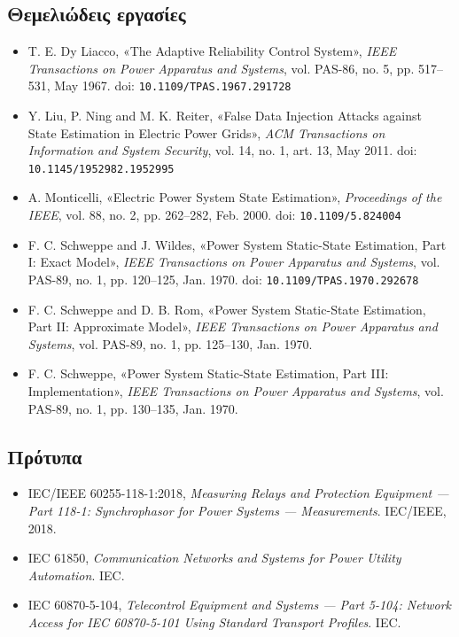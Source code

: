\subsection*{Θεμελιώδεις εργασίες}

\begin{itemize}
\item T. E. Dy Liacco, «The Adaptive Reliability Control System», \textit{IEEE Transactions
      on Power Apparatus and Systems}, vol. PAS-86, no. 5, pp. 517--531, May 1967.
      doi: \texttt{10.1109/TPAS.1967.291728}
\item Y. Liu, P. Ning and M. K. Reiter, «False Data Injection Attacks against State
      Estimation in Electric Power Grids», \textit{ACM Transactions on Information and System
      Security}, vol. 14, no. 1, art. 13, May 2011.
      doi: \texttt{10.1145/1952982.1952995}
\item A. Monticelli, «Electric Power System State Estimation», \textit{Proceedings of the
      IEEE}, vol. 88, no. 2, pp. 262--282, Feb. 2000.
      doi: \texttt{10.1109/5.824004}
\item F. C. Schweppe and J. Wildes, «Power System Static-State Estimation, Part I: Exact
      Model», \textit{IEEE Transactions on Power Apparatus and Systems}, vol. PAS-89, no. 1,
      pp. 120--125, Jan. 1970. doi: \texttt{10.1109/TPAS.1970.292678}
\item F. C. Schweppe and D. B. Rom, «Power System Static-State Estimation, Part II:
      Approximate Model», \textit{IEEE Transactions on Power Apparatus and Systems},
      vol. PAS-89, no. 1, pp. 125--130, Jan. 1970.
\item F. C. Schweppe, «Power System Static-State Estimation, Part III: Implementation»,
      \textit{IEEE Transactions on Power Apparatus and Systems}, vol. PAS-89, no. 1,
      pp. 130--135, Jan. 1970.
\end{itemize}

\subsection*{Πρότυπα}

\begin{itemize}
\item IEC/IEEE 60255-118-1:2018, \textit{Measuring Relays and Protection Equipment ---
      Part 118-1: Synchrophasor for Power Systems --- Measurements}. IEC/IEEE, 2018.
\item IEC 61850, \textit{Communication Networks and Systems for Power Utility Automation}. IEC.
\item IEC 60870-5-104, \textit{Telecontrol Equipment and Systems --- Part 5-104: Network
      Access for IEC 60870-5-101 Using Standard Transport Profiles}. IEC.
\end{itemize}

